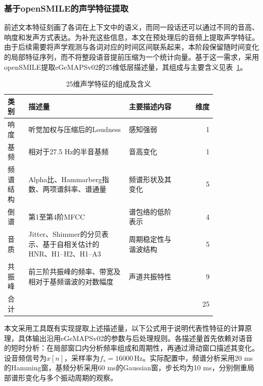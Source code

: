 \subsubsection{基于openSMILE的声学特征提取}

前述文本特征刻画了各词在上下文中的语义，而同一段话还可以通过不同的音高、响度和发声方式表达。为补充这些信息，本文在预处理后的音频上提取声学特征。由于后续需要将声学观测与各词对应的时间区间联系起来，本阶段保留随时间变化的局部特征序列，而不将整段语音提前压缩为一个统计向量。基于这一需求，采用openSMILE提取eGeMAPSv02的25维低层描述量，其组成与主要含义见表~\ref{tab:p1_acoustic_groups}。

\begin{table}[htbp]
    \centering
    \caption{25维声学特征的组成及含义}
    \label{tab:p1_acoustic_groups}
    \begingroup
    \small
    \renewcommand{\arraystretch}{1.25}
    \begin{tabular}{@{}p{0.10\linewidth}p{0.48\linewidth}p{0.24\linewidth}r@{}}
        \hline
        类别 & 描述量 & 主要描述内容 & 维度\\ \hline
        响度 & 听觉加权与压缩后的Loudness & 感知强弱 & 1\\
        基频 & 相对于27.5 Hz的半音基频 & 音高变化 & 1\\
        频谱结构 & Alpha比、Hammarberg指数、两项谱斜率、谱通量 & 频谱形状及其变化 & 5\\
        倒谱 & 第1至第4阶MFCC & 谱包络的低阶表示 & 4\\
        音质 & Jitter、Shimmer的分贝表示、基于自相关估计的HNR、H1--H2、H1--A3 & 周期稳定性与谐波结构 & 5\\
        共振峰 & 前三阶共振峰的频率、带宽及相对于基频谐波的对数幅度 & 声道共振特性 & 9\\ \hline
        合计 & & & 25\\ \hline
    \end{tabular}
    \endgroup
\end{table}

本文采用工具既有实现提取上述描述量，以下公式用于说明代表性特征的计算原理，具体输出沿用eGeMAPSv02的参数与后处理规则。各描述量首先依赖对语音的短时分析：在局部窗口内分析频率组成和周期性，再通过滑动窗口描述其变化。设音频信号为$x[n]$，采样率为$f_s=16000\,\mathrm{Hz}$。实际配置中，频谱分析采用20 ms的Hamming窗，基频分析采用60 ms的Gaussian窗，步长均为10 ms，分别侧重局部谱形变化与多个振动周期的观察。

